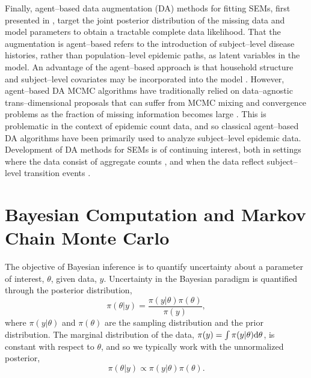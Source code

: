 Finally, agent--based data augmentation (DA) methods for fitting SEMs, first presented in \cite{gibson1998,oneill1999}, target the joint posterior distribution of the missing data and model parameters to obtain a tractable complete data likelihood. That the augmentation is agent--based refers to the introduction of subject--level disease histories, rather than population--level epidemic paths, as latent variables in the model. An advantage of the agent--based approach is that household structure and subject--level covariates may be incorporated into the model \cite{auranen2000,hohle2002,cauchemez2004bayesian, neal2004statistical,oneill2009}. However, agent--based DA MCMC algorithms have traditionally relied on data--agnostic trans--dimensional proposals that can suffer from MCMC mixing and convergence problems as the fraction of missing information becomes large \cite{roberts2001, mckinley2014simulation, pooley2015}. This is problematic in the context of epidemic count data, and so classical agent--based DA algorithms have been primarily used to analyze subject--level epidemic data. Development of DA methods for SEMs is of continuing interest, both in settings where the data consist of aggregate counts \cite{pooley2015,QinShe15,shestopaloff2016sampling}, and when the data reflect subject--level transition events \cite{kypraios2018bayesian,xu2016bayesian}.

\section{Bayesian Computation and Markov Chain Monte Carlo}
\label{sec:bayesian_computation}

The objective of Bayesian inference is to quantify uncertainty about a parameter of interest, $ \theta $, given data, $ y $. Uncertainty in the Bayesian paradigm is quantified through the posterior distribution, $$\pi(\theta|y)=\frac{\pi(y|\theta)\pi(\theta)}{\pi(y)},$$
where $ \pi(y|\theta) $ and $ \pi(\theta) $ are the sampling distribution and the prior distribution. The marginal distribution of the data, $ \pi(y) = \int\pi(y|\theta)\mathrm{d}\theta $, is constant with respect to $ \theta $, and so we typically work with the unnormalized posterior, $$ \pi(\theta|y)\propto\pi(y|\theta)\pi(\theta). $$

